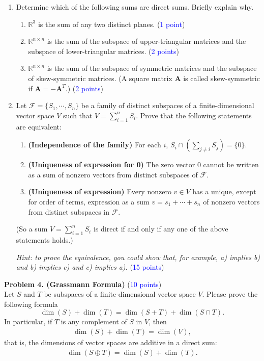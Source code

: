 \documentclass[english,onecolumn]{IEEEtran}
\begin{document}
\begin{enumerate}
    \item Determine which of the following sums are direct sums. Briefly explain why.
    \begin{enumerate}
        \item $\mathbb{R}^3$ is the sum of any two distinct planes. (\textcolor{blue}{1 point})
        \item $\mathbb{R}^{n\times n}$ is the sum of the subspace of upper-triangular matrices and the subspace of lower-triangular matrices. (\textcolor{blue}{2 points})
        \item $\mathbb{R}^{n\times n}$ is the sum of the subspace of symmetric matrices and the subspace of skew-symmetric matrices. (A square matrix $\mathbf{A}$ is called skew-symmetric if $\mathbf{A}=-\mathbf{A}^T$.) (\textcolor{blue}{2 points})
    \end{enumerate}

    \item Let $\mathcal{F}=\{S_1, \cdots, S_n\}$ be a family of distinct subspaces of a finite-dimensional vector space $V$ such that $V=\sum_{i=1}^{n}S_i$. Prove that the following statements are equivalent:
    \begin{enumerate}
        \item \textbf{(Independence of the family)} For each $i$, $S_i\cap\left(\sum_{j\neq i}S_j\right) = \{0\}$.
        \item \textbf{(Uniqueness of expression for 0)} The zero vector 0 cannot be written as a sum of nonzero vectors from distinct subspaces of $\mathcal{F}$.
        \item \textbf{(Uniqueness of expression)} Every nonzero $v\in V$ has a unique, except for order of terms, expression as a sum $v=s_1+\cdots+s_n$ of nonzero vectors from distinct subspaces in $\mathcal F$.
    \end{enumerate}
    (So a sum $V=\sum_{i=1}^{n}S_i$ is direct if and only if any one of the above statements holds.)

    \textit{Hint: to prove the equivalence, you could show that, for example, a) implies b) and b) implies c) and c) implies a).} (\textcolor{blue}{15 points})
\end{enumerate}


\newpage
\noindent\textbf{Problem 4. (Grassmann Formula)} (\textcolor{blue}{10 points})\\
Let $S$ and $T$ be subspaces of a finite-dimensional vector space $V$. Please prove the following formula 
$$
\dim(S) + \dim(T) = \dim(S+T) + \dim(S\cap T).
$$
In particular, if $T$ is any complement of $S$ in $V$, then
\begin{align*}
    \dim(S) + \dim(T) = \dim(V),
\end{align*}
that is, the dimensions of vector spaces are additive in a direct sum:
\begin{align*}
    \dim(S\oplus T) = \dim(S) + \dim(T).
\end{align*}
\end{document}
